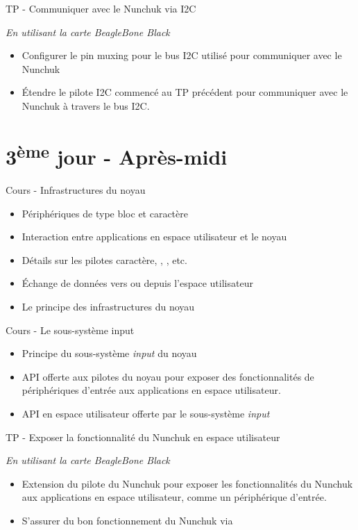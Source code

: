 \documentclass[a4paper,12pt,obeyspaces,spaces,hyphens]{article}
\begin{document}
\feagendaonecolumn
{TP - Communiquer avec le Nunchuk via I2C}
{
  {\em En utilisant la carte BeagleBone Black}
  \begin{itemize}
  \item Configurer le pin muxing pour le bus I2C utilisé pour
    communiquer avec le Nunchuk
  \item Étendre le pilote I2C commencé au TP précédent pour
    communiquer avec le Nunchuk à travers le bus I2C.
  \end{itemize}
}

\section{3\textsuperscript{ème} jour - Après-midi}

\feagendaonecolumn
{Cours - Infrastructures du noyau}
{
  \begin{itemize}
  \item Périphériques de type bloc et caractère
  \item Interaction entre applications en espace utilisateur et le noyau
  \item Détails sur les pilotes caractère,  ,
    , etc.
  \item Échange de données vers ou depuis l'espace utilisateur
  \item Le principe des infrastructures du noyau
  \end{itemize}
}

\feagendatwocolumn
{Cours - Le sous-système input}
{
  \begin{itemize}
  \item Principe du sous-système {\em input} du noyau
  \item API offerte aux pilotes du noyau pour exposer
    des fonctionnalités de périphériques d'entrée aux
    applications en espace utilisateur.
  \item API en espace utilisateur offerte par le
    sous-système {\em input}
  \end{itemize}
}
{TP - Exposer la fonctionnalité du Nunchuk en espace utilisateur}
{
  {\em En utilisant la carte BeagleBone Black}
  \begin{itemize}
  \item Extension du pilote du Nunchuk pour exposer les fonctionnalités
    du Nunchuk aux applications en espace utilisateur, comme
    un périphérique d'entrée.
  \item S'assurer du bon fonctionnement du Nunchuk via 
  \end{itemize}
}
\end{document}
